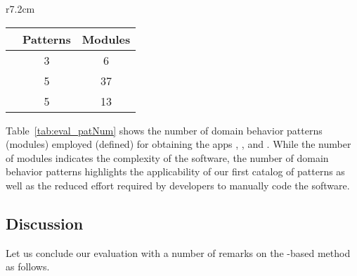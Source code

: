 {\makeatletter
	\let\par\@@par
	\par{}
	\everypar{}
	\begin{wraptable}{r}{7.2cm}
		\vspace{-0.5cm}
		\caption{Statistics of Behavior Patterns and Modules\\for \courseman, \processman, and \orderman}
		\vspace{0.1cm}
		\label{tab:eval_patNum}
		\begin{tabular}{lcc}
			\hline
			& Patterns & Modules \\ \hline
			\courseman  & 3                  & 6                 \\ 
			\processman & 5                  & 37                \\
			\orderman   & 5                  & 13                \\ \hline
		\end{tabular}
	\end{wraptable}
%
Table~\ref{tab:eval_patNum} shows the number of domain behavior patterns (modules) employed (defined) for obtaining the apps \courseman, \processman, and \orderman. While the number of modules indicates the complexity of the software, the number of domain behavior patterns highlights the applicability of our first catalog of patterns as well as the reduced effort required by developers to manually code the software.\par
}

\subsection{Discussion} 
\label{sect:eval-discussion}

Let us conclude our evaluation with a number of remarks on the \agl-based method as follows.

